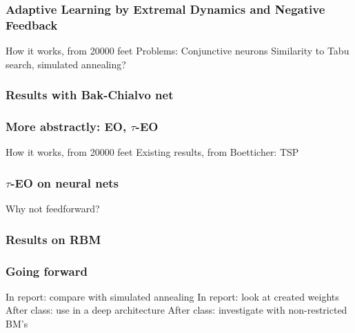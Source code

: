 \documentclass{beamer}
\begin{document}
\begin{frame}
  \frametitle{Adaptive Learning by Extremal Dynamics and Negative Feedback}
  How it works, from 20000 feet
  Problems: Conjunctive neurons
  Similarity to Tabu search, simulated annealing?
\end{frame}

\begin{frame}
  \frametitle{Results with Bak-Chialvo net}
\end{frame}

\begin{frame}
  \frametitle{More abstractly: EO, $\tau$-EO}
  How it works, from 20000 feet
  Existing results, from Boetticher: TSP
\end{frame}

\begin{frame}
  \frametitle{$\tau$-EO on neural nets}
  Why not feedforward?
\end{frame}

\begin{frame}
  \frametitle{Results on RBM}
\end{frame}

\begin{frame}
  \frametitle{Going forward}
  In report: compare with simulated annealing
  In report: look at created weights
  After class: use in a deep architecture
  After class: investigate with non-restricted BM's
\end{frame}
\end{document}
